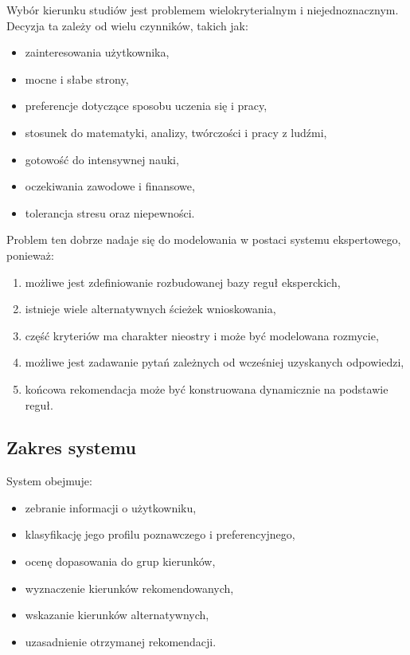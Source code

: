 \documentclass[12pt,a4paper,oneside]{article}
\begin{document}
Wybór kierunku studiów jest problemem wielokryterialnym i niejednoznacznym. Decyzja ta zależy od wielu czynników, takich jak:
\begin{itemize}[leftmargin=1.2cm]
    \item zainteresowania użytkownika,
    \item mocne i słabe strony,
    \item preferencje dotyczące sposobu uczenia się i pracy,
    \item stosunek do matematyki, analizy, twórczości i pracy z ludźmi,
    \item gotowość do intensywnej nauki,
    \item oczekiwania zawodowe i finansowe,
    \item tolerancja stresu oraz niepewności.
\end{itemize}

Problem ten dobrze nadaje się do modelowania w postaci systemu ekspertowego, ponieważ:
\begin{enumerate}[leftmargin=1.2cm]
    \item możliwe jest zdefiniowanie rozbudowanej bazy reguł eksperckich,
    \item istnieje wiele alternatywnych ścieżek wnioskowania,
    \item część kryteriów ma charakter nieostry i może być modelowana rozmycie,
    \item możliwe jest zadawanie pytań zależnych od wcześniej uzyskanych odpowiedzi,
    \item końcowa rekomendacja może być konstruowana dynamicznie na podstawie reguł.
\end{enumerate}

\subsection{Zakres systemu}

System obejmuje:
\begin{itemize}[leftmargin=1.2cm]
    \item zebranie informacji o użytkowniku,
    \item klasyfikację jego profilu poznawczego i preferencyjnego,
    \item ocenę dopasowania do grup kierunków,
    \item wyznaczenie kierunków rekomendowanych,
    \item wskazanie kierunków alternatywnych,
    \item uzasadnienie otrzymanej rekomendacji.
\end{itemize}
\end{document}
